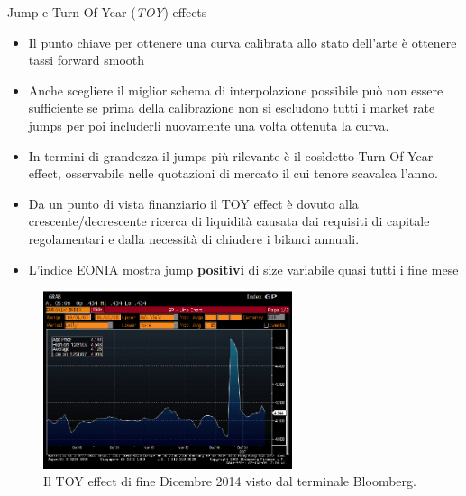 \begin{tframe}{Jump e Turn-Of-Year ({\it TOY}) effects}
\begin{itemize}
\item Il punto chiave per ottenere una curva calibrata allo stato dell'arte è ottenere tassi forward smooth
\item Anche scegliere il miglior schema di interpolazione possibile può non essere sufficiente se prima della calibrazione non si escludono tutti i market rate jumps per poi includerli nuovamente una volta ottenuta la curva.
\item In termini di grandezza il jumps più rilevante è il cosìdetto Turn-Of-Year effect, osservabile nelle quotazioni di mercato il cui tenore scavalca l'anno. 
\item Da un punto di vista finanziario il TOY effect è dovuto alla crescente/decrescente ricerca di liquidità causata dai requisiti di capitale regolamentari e dalla necessità di chiudere i bilanci annuali.
\end{itemize}
\end{tframe}
\begin{tframe}
\begin{itemize}
\item L'indice EONIA mostra jump {\bfseries positivi} di size variabile quasi tutti i fine mese
\end{itemize}
\begin{figure}[!h]
\centering
\includegraphics[width=0.65\textwidth]{turnofyear.png}
\caption{Il TOY effect di fine Dicembre 2014 visto dal terminale Bloomberg.}
\label{fig:turnofyear}
\end{figure}
\end{tframe}
